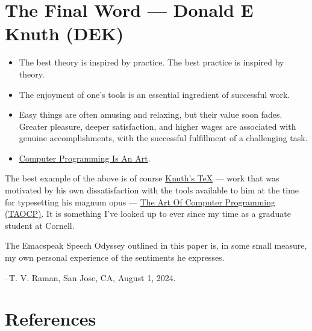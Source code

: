 \documentclass[11pt]{article}
\begin{document}
\section{The Final Word --- Donald E Knuth (DEK)}
\label{sec:orgc83c67b}

\begin{itemize}
\item The best theory is inspired by practice. The best practice is
inspired by theory.
\item The enjoyment of one's tools is an essential ingredient of
successful work.
\item Easy things are often amusing and relaxing, but their value soon
fades. Greater pleasure, deeper satisfaction, and higher wages are
associated with genuine accomplishments, with the successful
fulfillment of a challenging task.
\item \href{https://www.azquotes.com/author/8177-Donald\_Knuth}{Computer Programming Is An Art}.
\end{itemize}

The best example of the above is of course \href{https://en.wikipedia.org/wiki/TeX}{Knuth's \TeX{}} --- work that
    was motivated  by his own dissatisfaction with the tools available
    to him at the time for typesetting    his magnum opus --- \href{https://www-cs-faculty.stanford.edu/\~knuth/taocp.html}{The Art
    Of Computer Programming (TAOCP)}.  It is something I've looked up
    to ever since my time as a graduate student at Cornell.


The  Emacspeak Speech Odyssey outlined in this paper is, in some
small measure, my own personal
experience of the sentiments he expresses.

--T. V. Raman,  San Jose, CA, August 1, 2024.
\section{References}
\label{sec:org6b85b74}
\end{document}
